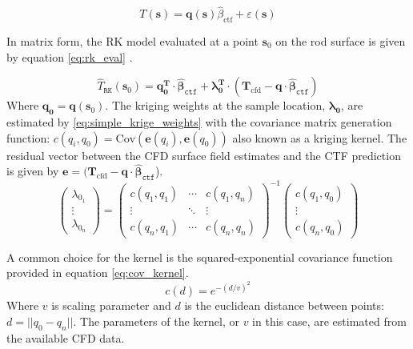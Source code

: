 \begin{equation}
    T(\mathbf s) = \mathbf q(\mathbf s) \hat \beta_{\mathrm{ctf}} + \varepsilon(\mathbf s)
\label{eq:decomp_2}
\end{equation}

In matrix form, the RK model evaluated at a point $\mathbf{s}_0 $ on the rod surface is given by equation \ref{eq:rk_eval} \cite{Hengl07}.

\begin{equation}
    \hat T_\mathtt{RK}(\mathbf{s}_0 ) = \mathbf{q}_\mathbf{0}^\mathbf{T} \cdot \mathbf{\hat \beta}_\mathtt{ctf} + \mathbf{\lambda }_\mathbf{0}^\mathbf{T} \cdot (\mathbf T_{\mathrm{cfd}}
- \mathbf{q} \cdot \mathbf{\hat \beta }_\mathtt{ctf} )
\label{eq:rk_eval}
\end{equation}
Where $\mathbf{q}_\mathbf{0}= \mathbf{q}(\mathbf s_0)$. The kriging weights at the sample location, $\mathbf{\lambda_0}$, are estimated by \ref{eq:simple_krige_weights} with the covariance matrix generation function: $c(q_i, q_0)= \mathrm{Cov}(\mathbf e(q_i), \mathbf e(q_0))$ also known as a kriging kernel.  The residual vector between the CFD surface field estimates and the CTF prediction is given by $\mathbf e = (\mathbf T_{\mathrm{cfd}} - \mathbf{q} \cdot \mathbf{\hat \beta }_\mathtt{ctf}$). 
\begin{equation}
\begin{pmatrix}\lambda_{0_1} \\ \vdots \\ \lambda_{0_n} \end{pmatrix}=
\begin{pmatrix}c(q_1,q_1) & \cdots & c(q_1,q_n) \\
\vdots & \ddots & \vdots  \\
c(q_n,q_1) & \cdots & c(q_n,q_n) 
\end{pmatrix}^{-1}
\begin{pmatrix}c(q_1,q_0) \\ \vdots \\ c(q_n,q_0) \end{pmatrix}
\label{eq:simple_krige_weights}
\end{equation}

A common choice for the kernel is the squared-exponential covariance function provided in equation \ref{eq:cov_kernel}.
\begin{equation}
    c(d) = e^{-(d/v)^2}
    \label{eq:cov_kernel}
\end{equation}
Where $v$ is scaling parameter and $d$ is the euclidean distance between points: $d=||q_0 - q_n||$.
The parameters of the kernel, or $v$ in this case, are estimated from the available CFD data.

